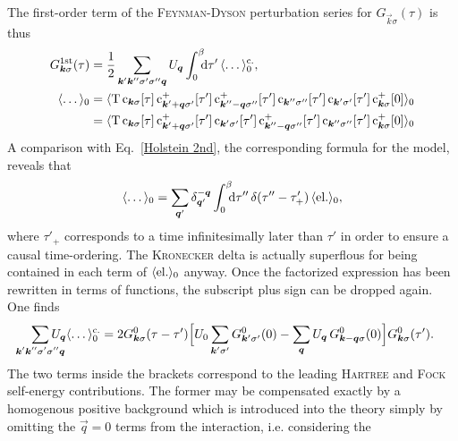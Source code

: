 The first-order term of the \textsc{Feynman-Dyson} perturbation series for
$G_{\vec k \sigma}(\tau)$ is thus
%
\begin{align*}
    G \super{1st}_{\vec k \sigma}(\tau) &= \frac 1 2
    \sum_{\vec k' \vec k'' \sigma' \sigma'' \vec q} U_{\vec q}
    \int \from 0 \till \beta \D \tau' \, \av \dots_0 \super{c.},
    \\
    \av \dots_0 &= \av{\op T \,
        \op c_{\vec k \sigma}[\tau] \,
        \op c_{\vec k' + \vec q \sigma'}^+[\tau'] \,
        \op c_{\vec k'' - \vec q \sigma''}^+[\tau'] \,
        \op c_{\vec k'' \sigma''}[\tau'] \,
        \op c_{\vec k' \sigma'}[\tau'] \,
        \op c_{\vec k \sigma}^+[0]
    }_0 \\ &= \av{\op T \,
        \op c_{\vec k \sigma}[\tau] \,
        \op c_{\vec k' + \vec q \sigma'}^+[\tau'] \,
        \op c_{\vec k' \sigma'}[\tau'] \,
        \op c_{\vec k'' - \vec q \sigma''}^+[\tau'] \,
        \op c_{\vec k'' \sigma''}[\tau'] \,
        \op c_{\vec k \sigma}^+[0]
    }_0
\end{align*}
%
A comparison with Eq.~\ref{Holstein 2nd}, the corresponding formula for the
 model, reveals that
%
\begin{align*}
    \av \dots_0 =
    \sum_{\vec q'} \delta_{\vec q'}^{-\vec q}
    \int \from 0 \till \beta \D \tau'' \,
    \delta(\tau'' - \tau'_+) \, \av{\text{el.}}_0,
\end{align*}
%
where $\tau'_+$ corresponds to a time infinitesimally later than $\tau'$ in
order to ensure a causal time-ordering. The \textsc{Kronecker} delta is actually
superflous for being contained in each term of $\langle\text{el.}\rangle_0$ anyway. Once
the factorized expression has been rewritten in terms of  functions,
the subscript plus sign can be dropped again. One finds
%
\begin{align*}
    \sum_{\mathclap{\vec k' \vec k'' \sigma' \sigma'' \vec q}}
    U_{\vec q} \av \dots_0 \super{c.} =
    2 G^0_{\vec k \sigma}(\tau - \tau')
    \Big[
        U_0 \sum_{\vec k' \sigma'} G^0_{\vec k' \sigma'}(0) -
        \sum_{\vec q} U_{\vec q} \, G^0_{\vec k - \vec q \sigma}(0)
    \Big]
    G^0_{\vec k \sigma}(\tau').
\end{align*}
%
The two terms inside the brackets correspond to the leading \textsc{Hartree} and
\textsc{Fock} self-energy contributions. The former may be compensated exactly
by a homogenous positive background which is introduced into the theory simply
by omitting the $\vec q = 0$ terms from the interaction, i.e. considering the
